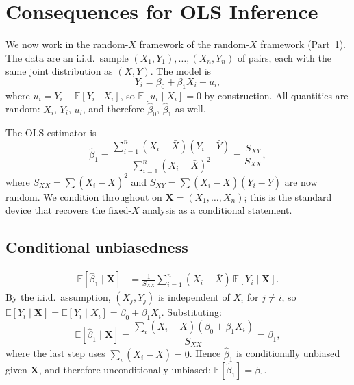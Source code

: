 \documentclass[a4paper,oneside,12pt]{extarticle}
\theoremstyle{plain}
\theoremstyle{definition}
\theoremstyle{remark}
\newcommand*{\E}{\mathbb{E}}
\begin{document}
\section{Consequences for OLS Inference}
\label{sec:consequences}

We now work in the random-$X$ framework of the random-$X$ framework (Part~1).
The data are an i.i.d.\ sample $(X_1,Y_1),\ldots,(X_n,Y_n)$ of pairs,
each with the same joint distribution as $(X,Y)$. The model is
\[
  Y_i = \beta_0 + \beta_1 X_i + u_i,
\]
where $u_i = Y_i - \E[Y_i \mid X_i]$, so $\E[u_i \mid X_i] = 0$ by
construction. All quantities are random: $X_i$, $Y_i$, $u_i$,
and therefore $\hat\beta_0$, $\hat\beta_1$ as well.

The OLS estimator is
\[
  \hat\beta_1
  = \frac{\sum_{i=1}^n (X_i - \bar X)(Y_i - \bar Y)}
         {\sum_{i=1}^n (X_i - \bar X)^2}
  = \frac{S_{XY}}{S_{XX}},
\]
where $S_{XX} = \sum(X_i-\bar X)^2$ and $S_{XY} = \sum(X_i-\bar X)(Y_i-\bar Y)$
are now random. We condition throughout on $\mathbf{X} = (X_1,\ldots,X_n)$;
this is the standard device that recovers the fixed-$X$ analysis as a
conditional statement.

\subsection{Conditional unbiasedness}

\begin{align*}
\E[\hat\beta_1 \mid \mathbf{X}]
  &= \frac{1}{S_{XX}}\sum_{i=1}^n (X_i-\bar X)\,\E[Y_i \mid \mathbf{X}].
\end{align*}
By the i.i.d.\ assumption, $(X_j, Y_j)$ is independent of $X_i$ for
$j \neq i$, so $\E[Y_i \mid \mathbf{X}] = \E[Y_i \mid X_i]
= \beta_0 + \beta_1 X_i$.
Substituting:
\[
  \E[\hat\beta_1 \mid \mathbf{X}]
  = \frac{\sum_i (X_i-\bar X)(\beta_0 + \beta_1 X_i)}{S_{XX}}
  = \beta_1,
\]
where the last step uses $\sum_i(X_i-\bar X) = 0$.
Hence $\hat\beta_1$ is conditionally unbiased given $\mathbf{X}$,
and therefore unconditionally unbiased: $\E[\hat\beta_1] = \beta_1$.
\end{document}
